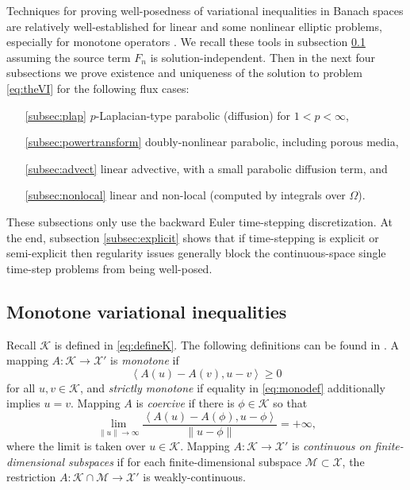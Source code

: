 \documentclass[final,leqno,onefignum,onetabnum]{siamltex1213bueler}
\newcommand{\ip}[2]{\ensuremath{\left<#1,#2\right>}}
\begin{document}
Techniques for proving well-posedness of variational inequalities in Banach spaces are relatively well-established for linear and some nonlinear elliptic problems, especially for monotone operators \cite{KinderlehrerStampacchia1980}.  We recall these tools in subsection \ref{subsec:mono} assuming the source term $F_n$ is solution-independent.  Then in the next four subsections we prove existence and uniqueness of the solution to problem \eqref{eq:theVI} for the following flux cases:
\begin{itemize}
\item[\ref{subsec:plap}] $p$-Laplacian-type parabolic (diffusion) for $1<p<\infty$,
\item[\ref{subsec:powertransform}] doubly-nonlinear parabolic, including porous media,
\item[\ref{subsec:advect}] linear advective, with a small parabolic diffusion term, and
\item[\ref{subsec:nonlocal}] linear and non-local (computed by integrals over $\Omega$).
\end{itemize}
These subsections only use the backward Euler time-stepping discretization.  At the end, subsection \ref{subsec:explicit} shows that if time-stepping is explicit or semi-explicit then regularity issues generally block the continuous-space single time-step problems from being well-posed.

\subsection{Monotone variational inequalities} \label{subsec:mono}  Recall $\mathcal{K}$ is defined in \eqref{eq:defineK}.  The following definitions can be found in \cite{KinderlehrerStampacchia1980}.  A mapping $A : \mathcal{K} \to \mathcal{X}'$ is \emph{monotone} if
\begin{equation}
   \ip{A(u) - A(v)}{u-v} \ge 0  \label{eq:monodef}
\end{equation}
for all $u,v\in\mathcal{K}$, and \emph{strictly monotone} if equality in \eqref{eq:monodef} additionally implies $u=v$.  Mapping $A$ is \emph{coercive} if there is $\phi\in \mathcal{K}$ so that
\begin{equation}
   \lim_{\|u\|\to\infty} \frac{\ip{A(u) - A(\phi)}{u-\phi}}{\|u-\phi\|} = +\infty, \label{eq:coercivedef}
\end{equation}
where the limit is taken over $u\in\mathcal{K}$.  Mapping $A : \mathcal{K} \to \mathcal{X}'$ is \emph{continuous on finite-dimensional subspaces} if for each finite-dimensional subspace $\mathcal{M} \subset \mathcal{X}$, the restriction $A : \mathcal{K}\cap \mathcal{M} \to \mathcal{X}'$ is weakly-continuous.
\end{document}
